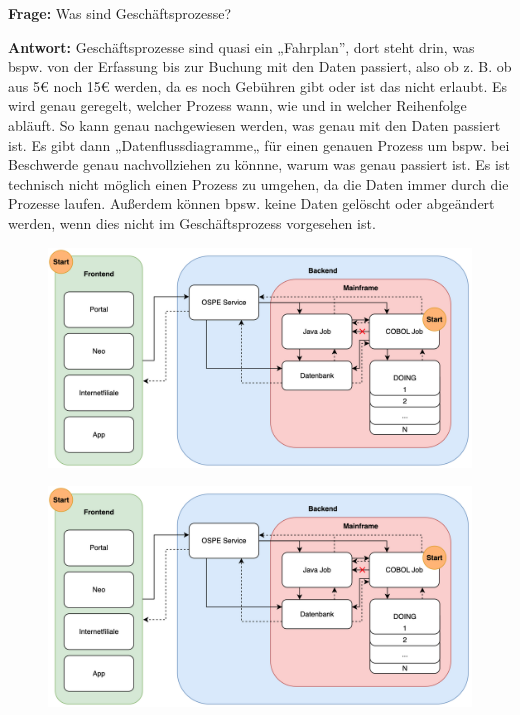 \bigbreak
\bigbreak

\textbf{Frage:}
\label{i1:f5}
Was sind Geschäftsprozesse?


\textbf{Antwort:}
Geschäftsprozesse sind quasi ein „Fahrplan”, dort steht drin, was bspw. von der Erfassung bis zur Buchung mit den Daten passiert, also ob z. B. ob aus 5€ noch 15€ werden, da es noch Gebühren gibt oder ist das nicht erlaubt.
Es wird genau geregelt, welcher Prozess wann, wie und in welcher Reihenfolge abläuft.
So kann genau nachgewiesen werden, was genau mit den Daten passiert ist.
Es gibt dann „Datenflussdiagramme„ für einen genauen Prozess um bspw. bei Beschwerde genau nachvollziehen zu könnne, warum was genau passiert ist.
Es ist technisch nicht möglich einen Prozess zu umgehen, da die Daten immer durch die Prozesse laufen.
Außerdem können bpsw. keine Daten gelöscht oder abgeändert werden, wenn dies nicht im Geschäftsprozess vorgesehen ist.

\newpage

\begin{figure}[ht]
    \centering\includegraphics[width=1.0\textwidth]{Abbildungen/OSPlus-Diagramm.png}
\end{figure}

\begin{figure}[ht]
    \centering\includegraphics[width=1.0\textwidth]{Abbildungen/OSPlus-Diagramm.png}
\end{figure}

\newpage

\bigbreak